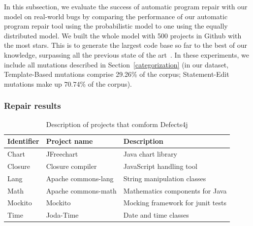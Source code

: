 \documentclass[conference]{IEEEtran}
\begin{document}
In this subsection, we evaluate the success of automatic program repair with our
model on real-world bugs  by comparing the performance of our 
automatic program repair tool using the probabilistic model to one using the
equally distributed model.  
We built the whole model with 500
projects in Github with the most stars.
 This is to generate the largest code base so far to the best 
of our knowledge, surpassing all the previous state of the 
art~\cite{long16proph,Soto15,zhong15,martinez15,xuan16}. 
In these experiments, we include all mutations described in
Section~\ref{categorization} (in our dataset, Template-Based mutations comprise 29.26\% of the corpus; Statement-Edit mutations make up 70.74\% of the 
corpus).

\subsubsection{Repair results}


\begin{table}[ht]
\centering
\begin{tabular}{lll}
\hline
Identifier & Project name & Description\\
\hline
Chart & JFreechart & Java chart library \\
Closure	& Closure compiler	 & JavaScript handling tool\\
Lang	& Apache commons-lang & String manipulation classes\\
Math	& Apache commons-math & Mathematics components for Java \\
Mockito &	Mockito	 & Mocking framework for junit tests \\
Time	& Joda-Time & Date and time classes \\
\hline
\end{tabular}
\newline
\center
  \caption{Description of projects that comform Defects4j}
  \label{defects4j}
\end{table} 
\end{document}
